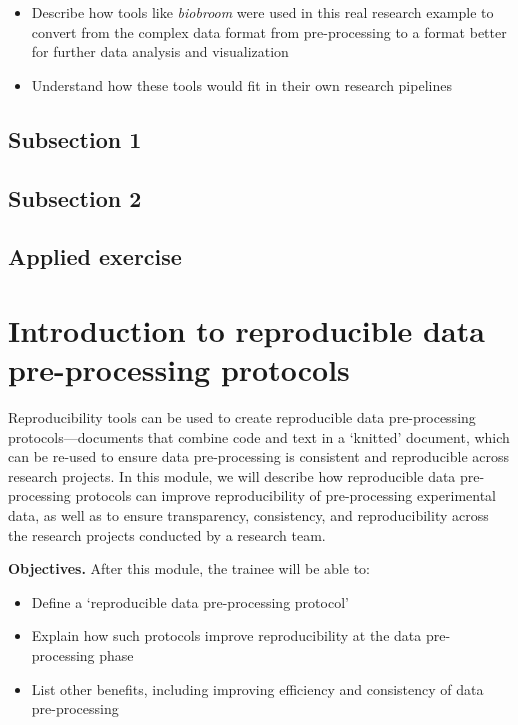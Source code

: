 \documentclass[]{tufte-book}
\providecommand{\tightlist}{%
  \setlength{\itemsep}{0pt}\setlength{\parskip}{0pt}}
\begin{document}
\begin{itemize}
\tightlist
\item
  Describe how tools like \textit{biobroom} were used in this real research
  example to convert from the complex data format from pre-processing to a format
  better for further data analysis and visualization
\item
  Understand how these tools would fit in their own research pipelines
\end{itemize}

\hypertarget{subsection-1}{%
\subsection{Subsection 1}\label{subsection-1}}

\hypertarget{subsection-2}{%
\subsection{Subsection 2}\label{subsection-2}}

\hypertarget{applied-exercise}{%
\subsection{Applied exercise}\label{applied-exercise}}

\hypertarget{introduction-to-reproducible-data-pre-processing-protocols}{%
\section{Introduction to reproducible data pre-processing protocols}\label{introduction-to-reproducible-data-pre-processing-protocols}}

Reproducibility tools can be used to create reproducible data pre-processing
protocols---documents that combine code and text in a `knitted' document, which
can be re-used to ensure data pre-processing is consistent and reproducible
across research projects. In this module, we will describe how reproducible data
pre-processing protocols can improve reproducibility of pre-processing
experimental data, as well as to ensure transparency, consistency, and
reproducibility across the research projects conducted by a research team.

\textbf{Objectives.} After this module, the trainee will be able to:

\begin{itemize}
\tightlist
\item
  Define a `reproducible data pre-processing protocol'
\item
  Explain how such protocols improve reproducibility at the data pre-processing
  phase
\item
  List other benefits, including improving efficiency and consistency of data
  pre-processing
\end{itemize}
\end{document}
